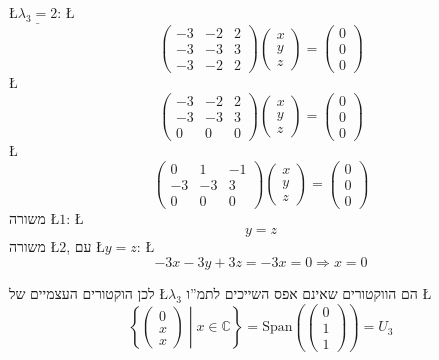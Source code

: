 \documentclass[english,hebrew]{article}
\begin{document}
\L{$\underline{\lambda_{3}=2}$}: \L{%
\[
\begin{pmatrix}-3 & -2 & 2\\
-3 & -3 & 3\\
-3 & -2 & 2
\end{pmatrix}\begin{pmatrix}x\\
y\\
z
\end{pmatrix}=\begin{pmatrix}0\\
0\\
0
\end{pmatrix}
\]
}%
\L{%
\[
\begin{pmatrix}-3 & -2 & 2\\
-3 & -3 & 3\\
0 & 0 & 0
\end{pmatrix}\begin{pmatrix}x\\
y\\
z
\end{pmatrix}=\begin{pmatrix}0\\
0\\
0
\end{pmatrix}
\]
}%
\L{%
\[
\begin{pmatrix}0 & 1 & -1\\
-3 & -3 & 3\\
0 & 0 & 0
\end{pmatrix}\begin{pmatrix}x\\
y\\
z
\end{pmatrix}=\begin{pmatrix}0\\
0\\
0
\end{pmatrix}
\]
}%
משורה \L{$1$}: \L{%
\[
y=z
\]
}%
משורה \L{$2$}, עם \L{$y=z$}: \L{%
\[
-3x-3y+3z=-3x=0\Longrightarrow x=0
\]
}%

לכן הוקטורים העצמיים של \L{$\lambda_{3}$} הם הווקטורים שאינם אפס
השייכים לתמ\textquotedblright ו \L{%
\[
\left\{ \begin{pmatrix}0\\
x\\
x
\end{pmatrix}\middle|x\in\mathbb{C}\right\} =\text{Span}\left(\begin{pmatrix}0\\
1\\
1
\end{pmatrix}\right)=U_{3}
\]
}%
\end{document}
